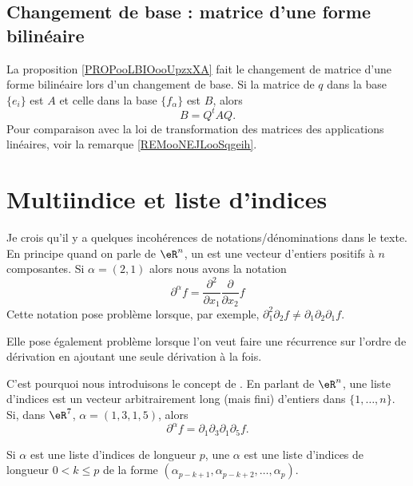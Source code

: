 \subsection{Changement de base : matrice d'une forme bilinéaire}

La proposition \ref{PROPooLBIOooUpzxXA} fait le changement de matrice d'une forme bilinéaire lors d'un changement de base. Si la matrice de \( q\) dans la base \( \{ e_i \}\) est \( A\) et celle dans la base \( \{ f_{\alpha} \}\) est \( B\), alors
\begin{equation}
	B=Q^tAQ.
\end{equation}
Pour comparaison avec la loi de transformation des matrices des applications linéaires, voir la remarque \ref{REMooNEJLooSqgeih}.

\section{Multiindice et liste d'indices}

\begin{normaltext}      \label{NORMooRRZCooMOKAzY}
	Je crois qu'il y a quelques incohérences de notations/dénominations dans le texte. En principe quand on parle de \( \eR^n\), un  \cite{BIBooYDMJooGDtdbo} est une vecteur d'entiers positifs à \( n\) composantes. Si \( \alpha=(2,1)\) alors nous avons la notation
	\begin{equation}
		\partial^{\alpha}f=\frac{ \partial^2  }{ \partial x_1 }\frac{ \partial  }{ \partial x_2 }f
	\end{equation}
	Cette notation pose problème lorsque, par exemple, \( \partial_1^2\partial_2f\neq \partial_1\partial_2\partial_1f\).

	Elle pose également problème lorsque l'on veut faire une récurrence sur l'ordre de dérivation en ajoutant une seule dérivation à la fois.

	C'est pourquoi nous introduisons le concept de . En parlant de \( \eR^n\), une liste d'indices est un vecteur arbitrairement long (mais fini) d'entiers dans \( \{ 1,\ldots, n \}\). Si, dans \( \eR^7\), \( \alpha=(1,3,1,5)\), alors
	\begin{equation}
		\partial^{\alpha}f=\partial_1\partial_3\partial_1\partial_5f.
	\end{equation}

	Si \( \alpha\) est une liste d'indices de longueur \( p\), une  \( \alpha\) est une liste d'indices de longueur \( 0 < k \leq p\) de la forme \( (\alpha_{p-k+1}, \alpha_{p-k+2},\ldots, \alpha_p)\).
\end{normaltext}


